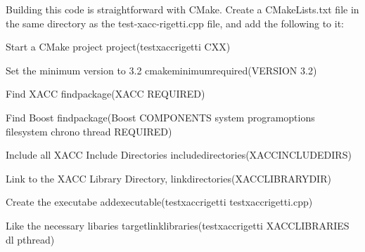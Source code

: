 \documentclass[letterpaper,10pt,english]{sphinxmanual}
\begin{document}
\begin{sphinxVerbatim}[commandchars=\\\{\}]

     

         
         
    

        

      
\end{sphinxVerbatim}

Building this code is straightforward with CMake. Create a CMakeLists.txt file in the same
directory as the test-xacc-rigetti.cpp file, and add the following to it:

\begin{sphinxVerbatim}[commandchars=\\\{\}]
\PYGZsh{} Start a CMake project
project(test\PYGZhy{}xacc\PYGZhy{}rigetti CXX)

\PYGZsh{} Set the minimum version to 3.2
cmake\PYGZus{}minimum\PYGZus{}required(VERSION 3.2)

\PYGZsh{} Find XACC
find\PYGZus{}package(XACC REQUIRED)

\PYGZsh{} Find Boost
find\PYGZus{}package(Boost COMPONENTS system program\PYGZus{}options filesystem chrono thread REQUIRED)

\PYGZsh{} Include all XACC Include Directories
include\PYGZus{}directories(\PYGZdl{}\PYGZob{}XACC\PYGZus{}INCLUDE\PYGZus{}DIRS\PYGZcb{})

\PYGZsh{} Link to the XACC Library Directory,
link\PYGZus{}directories(\PYGZdl{}\PYGZob{}XACC\PYGZus{}LIBRARY\PYGZus{}DIR\PYGZcb{})

\PYGZsh{} Create the executabe
add\PYGZus{}executable(test\PYGZhy{}xacc\PYGZhy{}rigetti test\PYGZhy{}xacc\PYGZhy{}rigetti.cpp)

\PYGZsh{} Like the necessary libaries
target\PYGZus{}link\PYGZus{}libraries(test\PYGZhy{}xacc\PYGZhy{}rigetti \PYGZdl{}\PYGZob{}XACC\PYGZus{}LIBRARIES\PYGZcb{} dl pthread)
\end{sphinxVerbatim}
\end{document}
